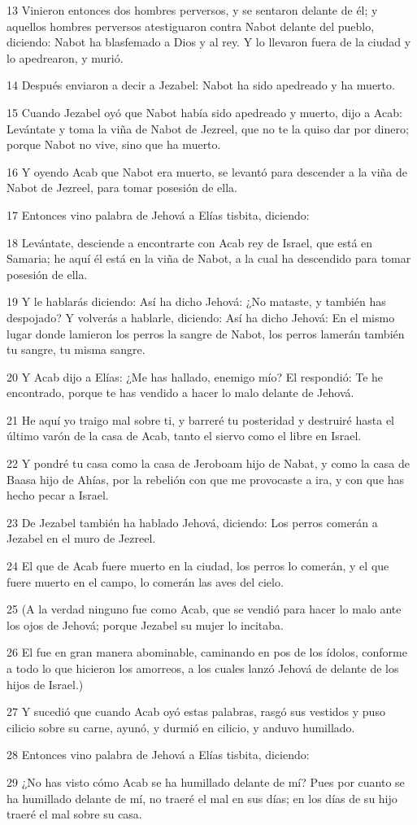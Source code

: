 \par 13 Vinieron entonces dos hombres perversos, y se sentaron delante de él; y aquellos hombres perversos atestiguaron contra Nabot delante del pueblo, diciendo: Nabot ha blasfemado a Dios y al rey. Y lo llevaron fuera de la ciudad y lo apedrearon, y murió.
\par 14 Después enviaron a decir a Jezabel: Nabot ha sido apedreado y ha muerto.
\par 15 Cuando Jezabel oyó que Nabot había sido apedreado y muerto, dijo a Acab: Levántate y toma la viña de Nabot de Jezreel, que no te la quiso dar por dinero; porque Nabot no vive, sino que ha muerto.
\par 16 Y oyendo Acab que Nabot era muerto, se levantó para descender a la viña de Nabot de Jezreel, para tomar posesión de ella.
\par 17 Entonces vino palabra de Jehová a Elías tisbita, diciendo:
\par 18 Levántate, desciende a encontrarte con Acab rey de Israel, que está en Samaria; he aquí él está en la viña de Nabot, a la cual ha descendido para tomar posesión de ella.
\par 19 Y le hablarás diciendo: Así ha dicho Jehová: ¿No mataste, y también has despojado? Y volverás a hablarle, diciendo: Así ha dicho Jehová: En el mismo lugar donde lamieron los perros la sangre de Nabot, los perros lamerán también tu sangre, tu misma sangre.
\par 20 Y Acab dijo a Elías: ¿Me has hallado, enemigo mío? El respondió: Te he encontrado, porque te has vendido a hacer lo malo delante de Jehová.
\par 21 He aquí yo traigo mal sobre ti, y barreré tu posteridad y destruiré hasta el último varón de la casa de Acab, tanto el siervo como el libre en Israel.
\par 22 Y pondré tu casa como la casa de Jeroboam hijo de Nabat, y como la casa de Baasa hijo de Ahías, por la rebelión con que me provocaste a ira, y con que has hecho pecar a Israel.
\par 23 De Jezabel también ha hablado Jehová, diciendo: Los perros comerán a Jezabel en el muro de Jezreel. 
\par 24 El que de Acab fuere muerto en la ciudad, los perros lo comerán, y el que fuere muerto en el campo, lo comerán las aves del cielo.
\par 25 (A la verdad ninguno fue como Acab, que se vendió para hacer lo malo ante los ojos de Jehová; porque Jezabel su mujer lo incitaba.
\par 26 El fue en gran manera abominable, caminando en pos de los ídolos, conforme a todo lo que hicieron los amorreos, a los cuales lanzó Jehová de delante de los hijos de Israel.)
\par 27 Y sucedió que cuando Acab oyó estas palabras, rasgó sus vestidos y puso cilicio sobre su carne, ayunó, y durmió en cilicio, y anduvo humillado.
\par 28 Entonces vino palabra de Jehová a Elías tisbita, diciendo:
\par 29 ¿No has visto cómo Acab se ha humillado delante de mí? Pues por cuanto se ha humillado delante de mí, no traeré el mal en sus días; en los días de su hijo traeré el mal sobre su casa.

